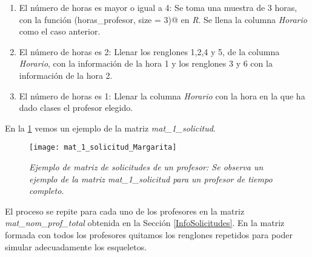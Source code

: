 \begin{enumerate}
\begin{enumerate}
\item El número de horas es mayor o igual a 4: Se toma una muestra de 3 horas, con la función \verb@sample(horas_profesor, size = 3)@ en \textit{R}. Se llena la columna \textit{Horario} como el caso anterior.

\item El número de horas es 2: Llenar los renglones 1,2,4 y 5, de la columna \textit{Horario}, con la información de la hora 1 y los renglones 3 y 6 con la información de la hora 2.

\item El número de horas es 1: Llenar la columna \textit{Horario} con la hora en la que ha dado clases el profesor elegido.
\end{enumerate}
\end{enumerate}

En la \figurename{\ref{mat_1_solicitud_Margarita}} vemos un ejemplo de la matriz \textit{mat\_1\_solicitud}.

\begin{figure}[H]
\centering
\texttt{[image: mat\_1\_solicitud\_Margarita]} %
\caption[\textit{Ejemplo de matriz de solicitudes de un profesor}]{\textit{Ejemplo de matriz de solicitudes de un profesor: Se observa un ejemplo de la matriz mat\_1\_solicitud para un profesor de tiempo completo.}}\label{mat_1_solicitud_Margarita}
\end{figure}

El proceso se repite para cada uno de los profesores en la matriz \textit{mat\_nom\_prof\_total} obtenida en la Sección \ref{InfoSolicitudes}. En la matriz formada con todos los profesores quitamos los renglones repetidos para poder simular adecuadamente los esqueletos.

